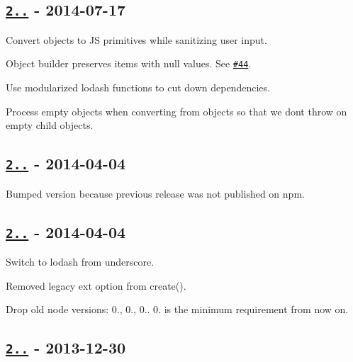 \subsection*{\href{https://github.com/oozcitak/xmlbuilder-js/compare/v2.2.1...v2.3.0}{\tt 2..} -\/ 2014-\/07-\/17}


\begin{DoxyItemize}
\item Convert objects to JS primitives while sanitizing user input.
\item Object builder preserves items with null values. See \href{https://github.com/oozcitak/xmlbuilder-js/issues/44}{\tt \#44}.
\item Use modularized lodash functions to cut down dependencies.
\item Process empty objects when converting from objects so that we don\textquotesingle{}t throw on empty child objects.
\end{DoxyItemize}

\subsection*{\href{https://github.com/oozcitak/xmlbuilder-js/compare/v2.2.0...v2.2.1}{\tt 2..} -\/ 2014-\/04-\/04}


\begin{DoxyItemize}
\item Bumped version because previous release was not published on npm.
\end{DoxyItemize}

\subsection*{\href{https://github.com/oozcitak/xmlbuilder-js/compare/v2.1.0...v2.2.0}{\tt 2..} -\/ 2014-\/04-\/04}


\begin{DoxyItemize}
\item Switch to lodash from underscore.
\item Removed legacy {\ttfamily ext} option from {\ttfamily create()}.
\item Drop old node versions\+: 0., 0., 0.. 0. is the minimum requirement from now on.
\end{DoxyItemize}

\subsection*{\href{https://github.com/oozcitak/xmlbuilder-js/compare/v2.0.1...v2.1.0}{\tt 2..} -\/ 2013-\/12-\/30}


